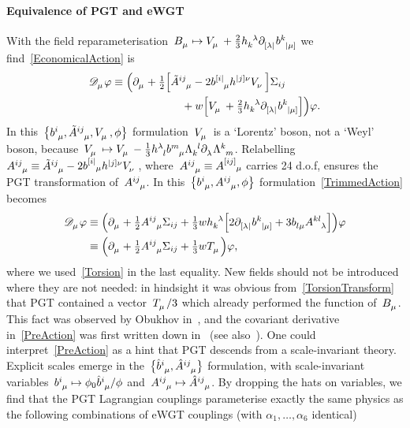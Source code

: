 \documentclass[aps,prd,reprint,preprintnumbers,showpacs,floatfix,nofootinbib,superscript address]{revtex4-2}
\begin{document}
\paragraph*{Equivalence of PGT and eWGT} With the field reparameterisation~$\FieldV{_\mu}\mapsto\FieldVV{_\mu}+\frac{2}{3}\FieldH{_k^\lambda}\PD{_{[\lambda|}}\FieldB{^k_{|\mu]}}$ we find~\cref{EconomicalAction} is 
\begin{align}
	\SCovD{_\mu}\varphi\equiv\Big(\PD{_\mu}+\tfrac{1}{2}\Big[&\FieldATilde{^{ij}_\mu}-2\FieldB{^{[i|}_\mu}\FieldH{^{|j]}^\nu}\FieldVV{_\nu}\Big]\Sigma{_{ij}}
	\nonumber\\&\ \ \ 
	+w\Big[\FieldVV{_\mu}+\tfrac{2}{3}\FieldH{_k^\lambda}\PD{_{[\lambda|}}\FieldB{^k_{|\mu]}}\Big]\Big)\varphi.\label{TrimmedAction}
\end{align}
In this~$\big\{\FieldB{^i_\mu},\FieldATilde{^{ij}_\mu},\FieldVV{_\mu},\phi\big\}$ formulation~$\FieldVV{_\mu}$ is a `Lorentz' boson, not a `Weyl' boson, because~$\FieldVV{_\mu}\mapsto\FieldVV{_\mu}-\frac{1}{3}\FieldH{^\lambda_l}\FieldB{^m_\mu}\FieldLambda{_k^l}\PD{_\lambda}\FieldLambda{^k_m}$. Relabelling~$\FieldA{^{ij}_\mu}\equiv\FieldATilde{^{ij}_\mu}-2\FieldB{^{[i|}_\mu}\FieldH{^{|j]}^\nu}\FieldVV{_\nu}$, where~$\FieldA{^{ij}_\mu}\equiv\FieldA{^{[ij]}_\mu}$ carries 24 d.o.f, ensures the PGT transformation of~$\FieldA{^{ij}_\mu}$. In this~$\big\{\FieldB{^i_\mu},\FieldA{^{ij}_\mu},\phi\big\}$ formulation~\cref{TrimmedAction} becomes
\begin{align}
	\SCovD{_\mu}\varphi&\equiv\Big(\PD{_\mu}+\tfrac{1}{2}\FieldA{^{ij}_\mu}\Sigma{_{ij}}
	+\tfrac{1}{3}w\FieldH{_k^\lambda}\Big[2\PD{_{[\lambda|}}\FieldB{^k_{|\mu]}}+3\FieldB{_l_\mu}\FieldA{^{kl}_\lambda}\Big]\Big)\varphi
	\nonumber\\&
	\equiv\Big(\PD{_\mu}+\tfrac{1}{2}\FieldA{^{ij}_\mu}\Sigma{_{ij}}
	+\tfrac{1}{3}w\MAGT{_\mu}\Big)\varphi,
\label{PreAction}
\end{align}
where we used~\cref{Torsion} in the last equality. New fields should not be introduced where they are not needed: in hindsight it was obvious from~\cref{TorsionTransform} that PGT contained a vector~$\MAGT{_\mu}/3$ which already performed the function of~$\FieldV{_\mu}$. This fact was observed by Obukhov in~\cite{Obukhov:1982zn}, and the covariant derivative in~\cref{PreAction} was first written down in~\cite{Lasenby:2015dba} (see also~\cite{Karananas:2021gco}). One could interpret~\cref{PreAction} as a hint that PGT descends from a scale-invariant theory. Explicit scales emerge in the~$\big\{\FieldBHat{^i_\mu},\FieldAHat{^{ij}_\mu}\big\}$ formulation, with scale-invariant variables~$\FieldB{^i_\mu}\mapsto\phi_0\FieldBHat{^i_\mu}/\phi$ and~$\FieldA{^{ij}_\mu}\mapsto\FieldAHat{^{ij}_\mu}$. By dropping the hats on variables, we find that the PGT Lagrangian couplings parameterise exactly the same physics as the following combinations of eWGT couplings (with  $\alpha_1,\ldots,\alpha_6$ identical)
\end{document}
